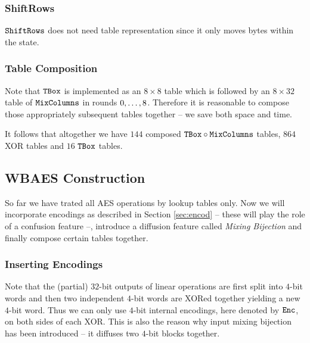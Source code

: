 \subsubsection{ShiftRows}
	
	$\texttt{ShiftRows}$ does not need table representation since it only moves bytes within the state.

\subsubsection{Table Composition}
	
	Note that $\texttt{TBox}$ is implemented as an $8\times 8$ table which is followed by an $8\times 32$ table of $\texttt{MixColumns}$ in rounds $0 , \ldots , 8$. Therefore it is reasonable to compose those appropriately subsequent tables together -- we save both space and time.
	
	It follows that altogether we have $144$ composed $\texttt{TBox}\circ\texttt{MixColumns}$ tables, $864$ XOR tables and $16$ $\texttt{TBox}$ tables.



\subsection{WBAES Construction}

So far we have trated all AES operations by lookup tables only. Now we will incorporate encodings as described in Section \ref{sec:encod} -- these will play the role of a confusion feature --, introduce a diffusion feature called {\em Mixing Bijection} and finally compose certain tables together.

\subsubsection{Inserting Encodings}
	
	Note that the (partial) $32$-bit outputs of linear operations are first split into $4$-bit words and then two independent $4$-bit words are XORed together yielding a new $4$-bit word. Thus we can only use $4$-bit internal encodings, here denoted by $\texttt{Enc}$, on both sides of each XOR. %
	This is also the reason why input mixing bijection has been introduced -- it diffuses two $4$-bit blocks together.
	
